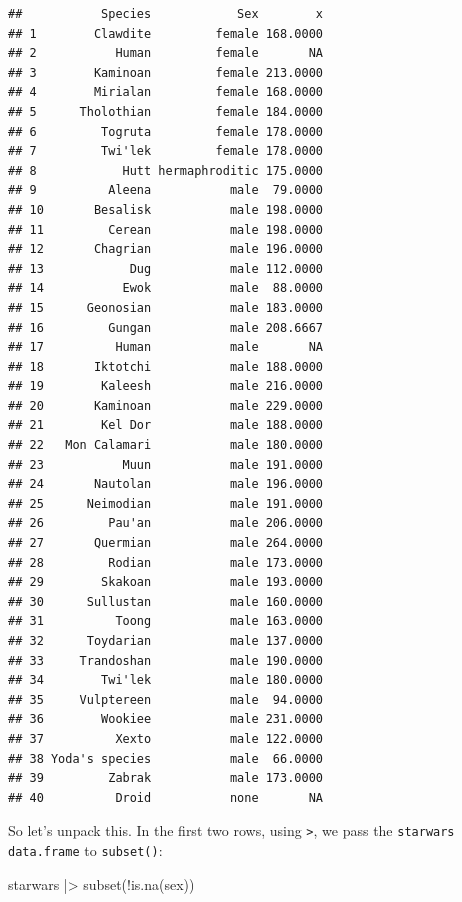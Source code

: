 \documentclass[
]{article}
\newenvironment{Shaded}{\begin{snugshade}}{\end{snugshade}}
\newcommand{\FunctionTok}[1]{\textcolor[rgb]{0.00,0.00,0.00}{#1}}
\newcommand{\NormalTok}[1]{#1}
\newcommand{\SpecialCharTok}[1]{\textcolor[rgb]{0.00,0.00,0.00}{#1}}
\begin{document}
\begin{verbatim}
##           Species            Sex        x
## 1        Clawdite         female 168.0000
## 2           Human         female       NA
## 3        Kaminoan         female 213.0000
## 4        Mirialan         female 168.0000
## 5      Tholothian         female 184.0000
## 6         Togruta         female 178.0000
## 7         Twi'lek         female 178.0000
## 8            Hutt hermaphroditic 175.0000
## 9          Aleena           male  79.0000
## 10       Besalisk           male 198.0000
## 11         Cerean           male 198.0000
## 12       Chagrian           male 196.0000
## 13            Dug           male 112.0000
## 14           Ewok           male  88.0000
## 15      Geonosian           male 183.0000
## 16         Gungan           male 208.6667
## 17          Human           male       NA
## 18       Iktotchi           male 188.0000
## 19        Kaleesh           male 216.0000
## 20       Kaminoan           male 229.0000
## 21        Kel Dor           male 188.0000
## 22   Mon Calamari           male 180.0000
## 23           Muun           male 191.0000
## 24       Nautolan           male 196.0000
## 25      Neimodian           male 191.0000
## 26         Pau'an           male 206.0000
## 27       Quermian           male 264.0000
## 28         Rodian           male 173.0000
## 29        Skakoan           male 193.0000
## 30      Sullustan           male 160.0000
## 31          Toong           male 163.0000
## 32      Toydarian           male 137.0000
## 33     Trandoshan           male 190.0000
## 34        Twi'lek           male 180.0000
## 35     Vulptereen           male  94.0000
## 36        Wookiee           male 231.0000
## 37          Xexto           male 122.0000
## 38 Yoda's species           male  66.0000
## 39         Zabrak           male 173.0000
## 40          Droid           none       NA
\end{verbatim}

So let's unpack this. In the first two rows, using \texttt{\textbar{}\textgreater{}}, we pass the \texttt{starwars} \texttt{data.frame} to \texttt{subset()}:

\begin{Shaded}
\begin{Highlighting}[]
\NormalTok{starwars }\SpecialCharTok{|\textgreater{}}
  \FunctionTok{subset}\NormalTok{(}\SpecialCharTok{!}\FunctionTok{is.na}\NormalTok{(sex))}
\end{Highlighting}
\end{Shaded}
\end{document}

